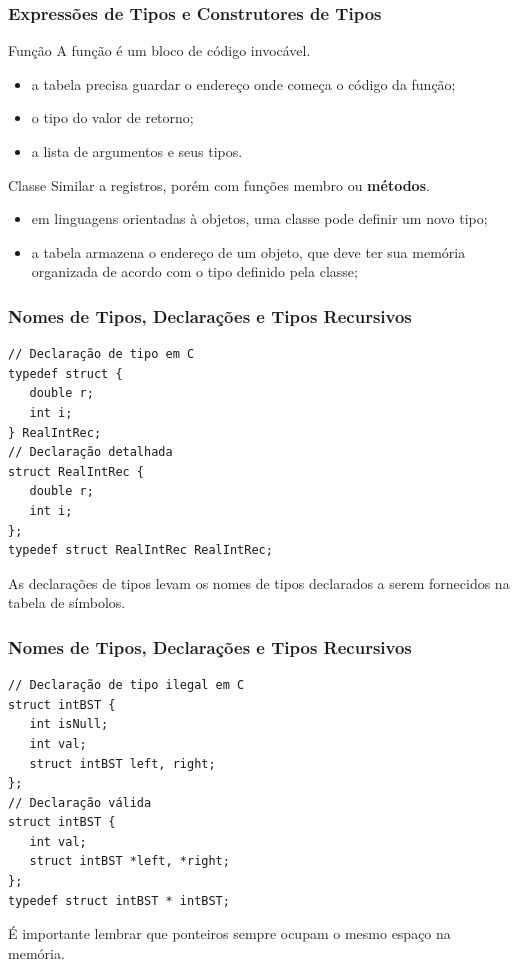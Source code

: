 \documentclass[table]{beamer}
\begin{document}
\begin{frame}[fragile]
   \frametitle{Expressões de Tipos e Construtores de Tipos}
   \begin{block}{Função}
   A função é um bloco de código invocável.
   \begin{itemize}
      \item a tabela precisa guardar o endereço onde começa o código da função;
      \item o tipo do valor de retorno;
      \item a lista de argumentos e seus tipos.
   \end{itemize}
   \end{block}
   \begin{block}{Classe}
   Similar a registros, porém com funções membro ou \textbf{métodos}.
   \begin{itemize}
      \item em linguagens orientadas à objetos, uma classe pode definir um novo tipo;
      \item a tabela armazena o endereço de um objeto, que deve ter sua memória organizada de acordo com o tipo definido pela classe;
   \end{itemize}
   \end{block}
\end{frame}

\begin{frame}[fragile]
   \frametitle{Nomes de Tipos, Declarações e Tipos Recursivos}
   \begin{verbatim}
// Declaração de tipo em C
typedef struct {
   double r;
   int i;
} RealIntRec;
// Declaração detalhada
struct RealIntRec {
   double r;
   int i;
};
typedef struct RealIntRec RealIntRec;
   \end{verbatim}
   As declarações de tipos levam os nomes de tipos declarados a serem fornecidos na tabela de símbolos.
\end{frame}

\begin{frame}[fragile]
   \frametitle{Nomes de Tipos, Declarações e Tipos Recursivos}
   \begin{verbatim}
// Declaração de tipo ilegal em C
struct intBST {
   int isNull;
   int val;
   struct intBST left, right;
};
// Declaração válida 
struct intBST {
   int val;
   struct intBST *left, *right;
};
typedef struct intBST * intBST;
   \end{verbatim}
   É importante lembrar que ponteiros sempre ocupam o mesmo espaço na memória.
\end{frame}
\end{document}
